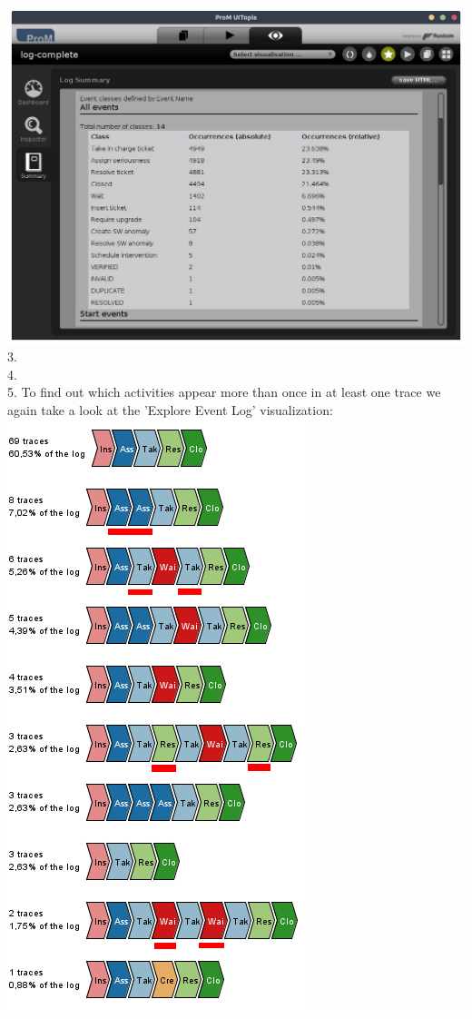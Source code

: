 \documentclass[../../main.tex]{subfiles}
\begin{document}
\includegraphics[width=0.8\columnwidth]{img/ProM_c_summary.png}
3.\\
4.\\
5. To find out which activities appear more than once in at least one trace we again take a look at the 'Explore Event Log' visualization:\\
\includegraphics[width=0.5\columnwidth]{img/ProM_c_traces_1.png}
\end{document}
